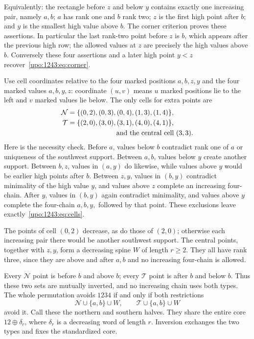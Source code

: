 \documentclass[11pt,letterpaper]{article}
\theoremstyle{remark}\newtheorem{remark}[theorem]{Remark}
\numberwithin{equation}{section}
\begin{document}
Equivalently: the rectangle before $z$ and below $y$ contains exactly one
increasing pair, namely $a,b$; $a$ has rank one and $b$ rank two; $z$ is
the first high point after $b$; and $y$ is the smallest high value above
$b$. The corner criterion proves these assertions. In particular the
last rank-two point before $z$ is $b$, which appears after the previous
high row; the allowed values at $z$ are precisely the high values above
$b$. Conversely these four assertions and a later high point $y<z$
recover~\eqref{upo:1243:eq:corner}.

Use cell coordinates relative to the four marked positions $a,b,z,y$
and the four marked values $a,b,y,z$: coordinate $(u,v)$ means $u$ marked
positions lie to the left and $v$ marked values lie below. The only cells
for extra points are
\begin{align}
 \mathcal N&=\{(0,2),(0,3),(0,4),(1,3),(1,4)\},\notag\\
 \mathcal T&=\{(2,0),(3,0),(3,1),(4,0),(4,1)\},\label{upo:1243:eq:cells}\\
 &\hspace{25mm}\text{and the central cell }(3,3).\notag
\end{align}
Here is the necessity check. Before $a$, values below $b$ contradict
rank one of $a$ or uniqueness of the southwest support. Between $a,b$,
values below $y$ create another support. Between $b,z$, values in $(a,y)$
do likewise, while values above $y$ would be earlier high points after
$b$. Between $z,y$, values in $(b,y)$ contradict minimality of the high
value $y$, and values above $z$ complete an increasing four-chain. After
$y$, values in $(b,y)$ again contradict minimality, and values above $y$
complete the four-chain $a,b,y,$ followed by that point. These exclusions
leave exactly~\eqref{upo:1243:eq:cells}.

The points of cell $(0,2)$ decrease, as do those of $(2,0)$; otherwise
each increasing pair there would be another southwest support. The
central points, together with $z,y$, form a decreasing spine $W$ of
length $r\ge2$. They all have rank three, since they are above and after
$a,b$ and no increasing four-chain is allowed.

Every $\mathcal N$ point is before $b$ and above $b$; every $\mathcal T$
point is after $b$ and below $b$. Thus these two sets are mutually
inverted, and no increasing chain uses both types. The whole permutation
avoids $1234$ if and only if both restrictions
\[
 \mathcal N\cup\{a,b\}\cup W,
 \qquad \mathcal T\cup\{a,b\}\cup W
\]
avoid it. Call these the northern and southern halves. They share the
entire core $12\oplus\delta_r$, where $\delta_r$ is a decreasing word of
length $r$. Inversion exchanges the two types and fixes the standardized
core.
\end{document}
